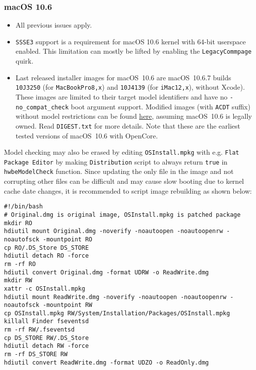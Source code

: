 \documentclass[]{article}
\begin{document}
\subsubsection{macOS 10.6}\label{legacy106}

\begin{itemize}
  \item All previous issues apply.
  \item \texttt{SSSE3} support is a requirement for macOS 10.6 kernel
    with 64-bit userspace enabled. This limitation can mostly be lifted
    by enabling the \texttt{LegacyCommpage} quirk.
  \item Last released installer images for macOS~10.6 are macOS~10.6.7
    builds \texttt{10J3250} (for \texttt{MacBookPro8,x}) and
    \texttt{10J4139} (for \texttt{iMac12,x}), without Xcode). These
    images are limited to their target model identifiers and have no
    \texttt{-no\_compat\_check} boot argument support. Modified images
    (with \texttt{ACDT} suffix) without model restrictions can be found
    \href{https://mega.nz/folder/z5YUhYTb#gA\_IRY5KMuYpnNCg7kR3ug}{here},
    assuming macOS~10.6 is legally owned. Read \texttt{DIGEST.txt}
    for more details. Note that these are the earliest tested
    versions of macOS~10.6 with OpenCore.
\end{itemize}

  Model checking may also be erased by editing \texttt{OSInstall.mpkg}
  with e.g. \texttt{Flat Package Editor} by making \texttt{Distribution}
  script to always return \texttt{true} in \texttt{hwbeModelCheck} function.
  Since updating the only file in the image and not corrupting other files
  can be difficult and may cause slow booting due to kernel cache date
  changes, it is recommended to script image rebuilding as shown below:

\begin{lstlisting}[label=snowrebuild, style=ocbash]
#!/bin/bash
# Original.dmg is original image, OSInstall.mpkg is patched package
mkdir RO
hdiutil mount Original.dmg -noverify -noautoopen -noautoopenrw -noautofsck -mountpoint RO
cp RO/.DS_Store DS_STORE
hdiutil detach RO -force
rm -rf RO
hdiutil convert Original.dmg -format UDRW -o ReadWrite.dmg
mkdir RW
xattr -c OSInstall.mpkg
hdiutil mount ReadWrite.dmg -noverify -noautoopen -noautoopenrw -noautofsck -mountpoint RW
cp OSInstall.mpkg RW/System/Installation/Packages/OSInstall.mpkg
killall Finder fseventsd
rm -rf RW/.fseventsd
cp DS_STORE RW/.DS_Store
hdiutil detach RW -force
rm -rf DS_STORE RW
hdiutil convert ReadWrite.dmg -format UDZO -o ReadOnly.dmg
\end{lstlisting}
\end{document}
